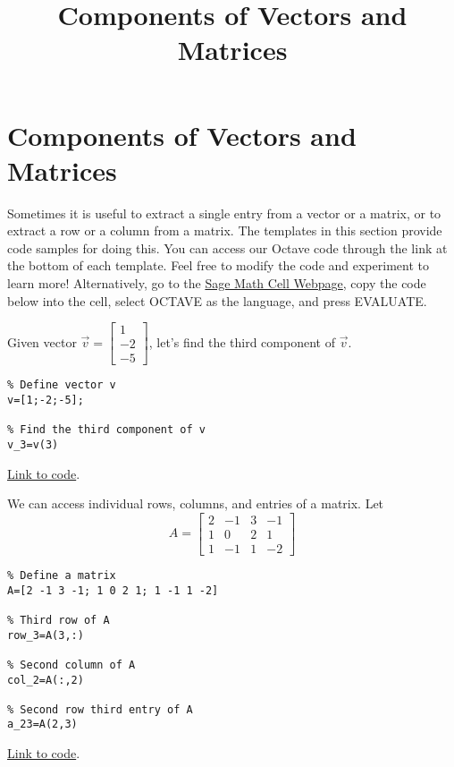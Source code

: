 \documentclass{ximera}
\title{Components of Vectors and Matrices} \license{CC BY-NC-SA 4.0}
\begin{document}
\begin{abstract}
\end{abstract}
\maketitle
\section*{Components of Vectors and Matrices}

Sometimes it is useful to extract a single entry from a vector or a matrix, or to extract a row or a column from a matrix.  The templates in this section provide code samples for doing this. You can access our Octave code through the link at the bottom of each template.  Feel free to modify the code and experiment to learn more!  Alternatively, go to the \href{https://sagecell.sagemath.org/}{Sage Math Cell Webpage}, copy the code below into the cell, select OCTAVE as the language, and press EVALUATE.  

\begin{template}\label{temp:vectorComp}
    Given vector $\vec{v}=\begin{bmatrix}1\\-2\\-5\end{bmatrix}$, let's find the third component of $\vec{v}$.
\begin{verbatim}
% Define vector v
v=[1;-2;-5];

% Find the third component of v
v_3=v(3)
\end{verbatim}

    \href{https://sagecell.sagemath.org/?z=eJxTVXBJTcvMS1UoS00uyS9SKOPlKrONNrTWNbLWNY215uXi5VJVcMvMS1EoyUgF4syiFIXk_NyC_LzUvBKF_DSwhnhj2zINY00AVTYWYw==&lang=octave&interacts=eJyLjgUAARUAuQ==}{Link to code}.
\end{template}

\begin{template}\label{temp:matrixRowColEntry}
    We can access individual rows, columns, and entries of a matrix.  Let $$A=\begin{bmatrix}2 & -1 & 3 & -1\\1 & 0 & 2 & 1\\1 & -1 & 1 & -2\end{bmatrix}$$
\begin{verbatim}
% Define a matrix 
A=[2 -1 3 -1; 1 0 2 1; 1 -1 1 -2]

% Third row of A
row_3=A(3,:)

% Second column of A
col_2=A(:,2)

% Second row third entry of A
a_23=A(2,3)   
\end{verbatim}
\href{https://sagecell.sagemath.org/?z=eJxVjEEKwjAURPeB3GE2BQsR7M-u0kXAG9SdSAhtigGbQIhYb-9v7cbNMDM8XoWLn0L0cJhdyWGBFKa7EY4NNMcZDU4gbIU_DrpLIUWF6yPkETm9kSYYKbhZ3ZmDVm39I3o_pDhiSM_XHHeKhyWmWkX_1Coqm9LHkj877iytTlK6_gIqSCuZ&lang=octave&interacts=eJyLjgUAARUAuQ==}{Link to code}.
\end{template}
\end{document}
